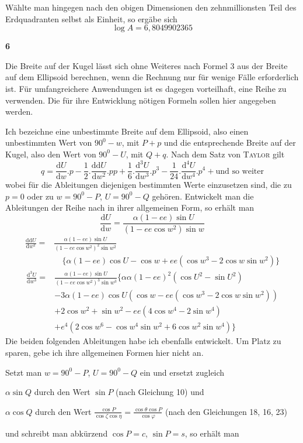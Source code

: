 %
\noindent Wählte man hingegen nach den obigen Dimensionen den zehnmillionsten Teil des Erdquadranten selbst als Einheit, so ergäbe sich
\[
\log A=6{,}8049902365
\]
\par\medskip{}\centerline{\textbf{6}}\nobreak\smallskip
\indent Die Breite auf der Kugel lässt sich ohne Weiteres nach Formel 3 aus der Breite auf dem Ellipsoid berechnen, wenn die Rechnung nur für wenige Fälle erforderlich ist. Für umfangreichere Anwendungen ist es dagegen vorteilhaft, eine Reihe zu verwenden. Die für ihre Entwicklung nötigen Formeln sollen hier angegeben werden.

Ich bezeichne eine unbestimmte Breite auf dem Ellipsoid, also einen unbestimmten Wert von \(90^0-w\), mit \(P+p\) und die entsprechende Breite auf der Kugel, also den Wert von \(90^0-U\), mit \(Q+q\). Nach dem Satz von \textsc{Taylor} gilt
\[
q=\frac{\mathrm{d}U}{\mathrm{d}w}\mathord{.}p-\frac{1}{2}\mathord{.}\frac{\mathrm{dd}U}{\mathrm{d}w^2}\mathord{.}pp+\frac{1}{6}\mathord{.}\frac{\mathrm{d}^3U}{\mathrm{d}w^3}\mathord{.}p^3-\frac{1}{24}\mathord{.}\frac{\mathrm{d}^4U}{\mathrm{d}w^4}\mathord{.}p^4+\text{und so weiter}
\]
wobei für die Ableitungen diejenigen bestimmten Werte einzusetzen sind, die zu \(p=0\) oder zu \(w=90^0-P\), \(U=90^0-Q\) gehören. Entwickelt man die Ableitungen der Reihe nach in ihrer allgemeinen Form, so erhält man
\[
\frac{\mathrm{d}U}{\mathrm{d}w}=\frac{\alpha(1-ee)\sin U}{(1-ee\cos w^2)\sin w}
\]
\[
\begin{aligned}
\frac{\mathrm{dd}U}{\mathrm{d}w^2}={}&\frac{\alpha(1-ee)\sin U}{(1-ee\cos w^2)^2\sin w^2}\\
&\quad\{\alpha(1-ee)\cos U-\cos w+ee(\cos w^3-2\cos w\sin w^2)\}
\end{aligned}
\]
\[
\begin{aligned}
\frac{\mathrm{d}^3U}{\mathrm{d}w^3}={}&\frac{\alpha(1-ee)\sin U}{(1-ee\cos w^2)^3\sin w^3}\{\alpha\alpha(1-ee)^2(\cos U^2-\sin U^2)\\
&-3\alpha(1-ee)\cos U(\cos w-ee(\cos w^3-2\cos w\sin w^2))\\
&+2\cos w^2+\sin w^2-ee(4\cos w^4-2\sin w^4)\\
&+e^4(2\cos w^6-\cos w^4\sin w^2+6\cos w^2\sin w^4)\}
\end{aligned}
\]
Die beiden folgenden Ableitungen habe ich ebenfalls entwickelt. Um Platz zu sparen, gebe ich ihre allgemeinen Formen hier nicht an.

Setzt man \(w=90^0-P\), \(U=90^0-Q\) ein und ersetzt zugleich
\par\noindent \(\alpha\sin Q\) durch den Wert \(\sin P\) (nach Gleichung 10) und
\par\noindent \(\alpha\cos Q\) durch den Wert \(\frac{\cos P}{\cos\zeta\cos\eta}=\frac{\cos\theta\cos P}{\cos\varphi}\) (nach den Gleichungen 18, 16, 23)
\par\noindent und schreibt man abkürzend \(\cos P=c\), \(\sin P=s\), so erhält man
